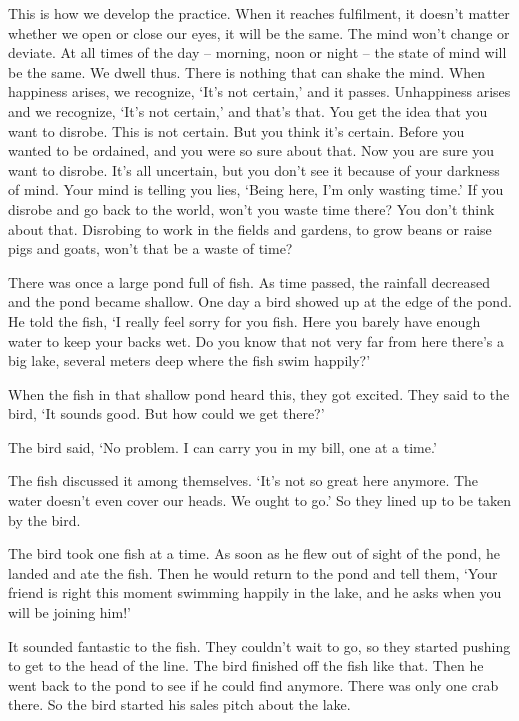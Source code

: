 This is how we develop the practice. When it reaches fulfilment, it doesn't matter whether we open or close our eyes, it will be the same. The mind won't change or deviate. At all times of the day -- morning, noon or night -- the state of mind will be the same. We dwell thus. There is nothing that can shake the mind. When happiness arises, we recognize, `It's not certain,' and it passes. Unhappiness arises and we recognize, `It's not certain,' and that's that. You get the idea that you want to disrobe. This is not certain. But you think it's certain. Before you wanted to be ordained, and you were so sure about that. Now you are sure you want to disrobe. It's all uncertain, but you don't see it because of your darkness of mind. Your mind is telling you lies, `Being here, I'm only wasting time.' If you disrobe and go back to the world, won't you waste time there? You don't think about that. Disrobing to work in the fields and gardens, to grow beans or raise pigs and goats, won't that be a waste of time?

There was once a large pond full of fish. As time passed, the rainfall decreased and the pond became shallow. One day a bird showed up at the edge of the pond. He told the fish, `I really feel sorry for you fish. Here you barely have enough water to keep your backs wet. Do you know that not very far from here there's a big lake, several meters deep where the fish swim happily?'

When the fish in that shallow pond heard this, they got excited. They said to the bird, `It sounds good. But how could we get there?'

The bird said, `No problem. I can carry you in my bill, one at a time.'

The fish discussed it among themselves. `It's not so great here anymore. The water doesn't even cover our heads. We ought to go.' So they lined up to be taken by the bird.

The bird took one fish at a time. As soon as he flew out of sight of the pond, he landed and ate the fish. Then he would return to the pond and tell them, `Your friend is right this moment swimming happily in the lake, and he asks when you will be joining him!'

It sounded fantastic to the fish. They couldn't wait to go, so they started pushing to get to the head of the line. The bird finished off the fish like that. Then he went back to the pond to see if he could find anymore. There was only one crab there. So the bird started his sales pitch about the lake.

